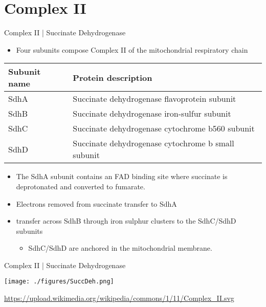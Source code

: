 \documentclass[presentation, smaller]{beamer}
\begin{document}
\section{Complex II}
\label{sec:orgb232af1}
\begin{frame}[label={sec:org2346ac0}]{Complex II | Succinate Dehydrogenase}
\begin{itemize}
\item Four subunits compose Complex II of the mitochondrial respiratory chain
\end{itemize}

\begin{center}
\begin{tabular}{ll}
Subunit name & Protein description\\
\hline
SdhA & Succinate dehydrogenase flavoprotein subunit\\
SdhB & Succinate dehydrogenase iron-sulfur subunit\\
SdhC & Succinate dehydrogenase cytochrome b560 subunit\\
SdhD & Succinate dehydrogenase cytochrome b small subunit\\
\end{tabular}
\end{center}

\begin{itemize}
\item The SdhA subunit contains an FAD binding site where succinate
is deprotonated and converted to fumarate.
\end{itemize}

\centering
{}

\begin{itemize}
\item Electrons removed from succinate transfer to SdhA
\item transfer across SdhB through iron sulphur clusters to the SdhC/SdhD subunits
\begin{itemize}
\item SdhC/SdhD are anchored in the mitochondrial membrane.
\end{itemize}
\end{itemize}
\end{frame}

\begin{frame}[label={sec:orgfd75226}]{Complex II | Succinate Dehydrogenase}
\begin{center}
\texttt{[image: ./figures/SuccDeh.png]}
\end{center}

\url{https://upload.wikimedia.org/wikipedia/commons/1/11/Complex\_II.svg}
\end{frame}
\end{document}
